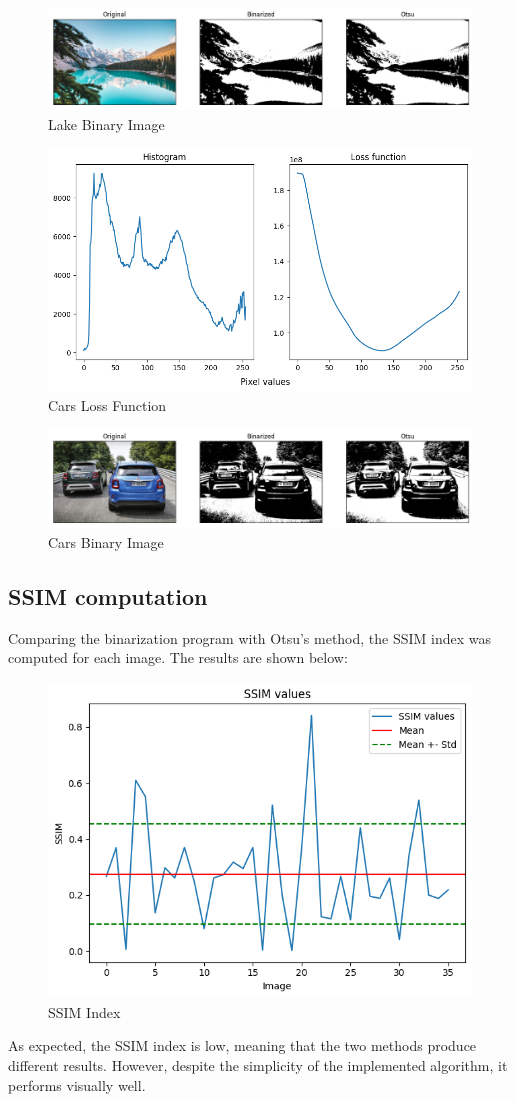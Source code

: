 \begin{figure}[h]
    \centering
    \includegraphics[width=0.6\columnwidth]{../Images/examples/lake_bin.png}
    \caption{Lake Binary Image}
    \label{fig-2}
\end{figure}

\begin{figure}[h]
    \centering
    \includegraphics[width=0.6\columnwidth]{../Images/examples/cars_loss.png}
    \caption{Cars Loss Function}
    \label{fig-3}
\end{figure}

\begin{figure}[h]
    \centering
    \includegraphics[width=0.6\columnwidth]{../Images/examples/cars_bin.png}
    \caption{Cars Binary Image}
    \label{fig-4}
\end{figure}

\subsection{SSIM computation}

Comparing the binarization program with Otsu's method, the SSIM index was computed for each image. The results are shown below:

\begin{figure}[h]
    \centering
    \includegraphics[width=0.6\columnwidth]{../Images/examples/SSIM.png}
    \caption{SSIM Index}
    \label{fig-5}
\end{figure}

\noindent
As expected, the SSIM index is low, meaning that the two methods produce different results. However, despite the simplicity of the implemented algorithm, it performs visually well.
